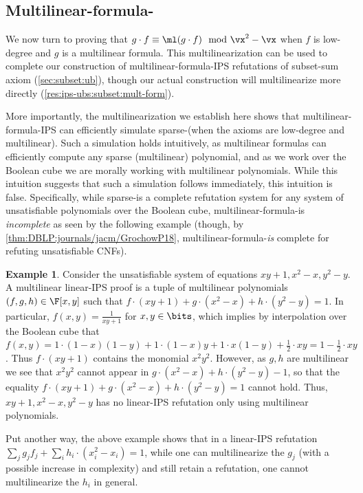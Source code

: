 \documentclass[11pt]{article}
\numberwithin{equation}{section}
\theoremstyle{definition}
\newtheorem{example}[theorem]{Example}
\theoremstyle{plain}
\begin{document}
\subsection{Multilinear-formula-\lbIPS}\label{sec:multilinearization:mult-form}

We now turn to proving that $g\cdot f\equiv \ml(g\cdot f) \mod \vx^2-\vx$ when $f$ is low-degree and $g$ is a multilinear formula.  This multilinearization can be used to complete our construction of multilinear-formula-IPS refutations of subset-sum axiom (\autoref{sec:subset:ub}), though our actual construction will multilinearize more directly (\autoref{res:ips-ubs:subset:mult-form}).

More importantly, the multilinearization we establish here shows that multilinear-formula-IPS can efficiently simulate sparse-\lIPS (when the axioms are low-degree and multilinear).  Such a simulation holds intuitively, as multilinear formulas can efficiently compute any sparse (multilinear) polynomial, and as we work over the Boolean cube we are morally working with multilinear polynomials.  While this intuition suggests that such a simulation follows immediately, this intuition is false. Specifically, while sparse-\lIPS is a complete refutation system for any system of unsatisfiable polynomials over the Boolean cube, multilinear-formula-\lIPS is \emph{incomplete} as seen by the following example (though, by \autoref{thm:DBLP:journals/jacm/GrochowP18}, multilinear-formula-\lIPS \emph{is} complete for refuting unsatisfiable CNFs).

\begin{example}\label{ex:multi-form:incomplete}
        Consider the unsatisfiable system of equations $xy+1,x^2-x,y^2-y$.  A multilinear linear-IPS proof is a tuple of multilinear polynomials $(f,g,h)\in\F[x,y]$ such that $f\cdot (xy+1)+g\cdot (x^2-x)+h\cdot (y^2-y)=1$.  In particular, $f(x,y)=\frac{1}{xy+1}$ for $x,y\in\bits$, which implies by interpolation over the Boolean cube that $f(x,y)=1\cdot (1-x)(1-y)+1\cdot (1-x)y+1\cdot x(1-y)+\frac{1}{2} \cdot xy=1-\frac{1}{2}\cdot xy$.  Thus $f\cdot (xy+1)$ contains the monomial $x^2y^2$.  However, as $g,h$ are multilinear we see that $x^2y^2$ cannot appear in $g\cdot (x^2-x)+h\cdot (y^2-y)-1$, so that the equality $f\cdot (xy+1)+g\cdot (x^2-x)+h\cdot (y^2-y)=1$ cannot hold. Thus, $xy+1,x^2-x,y^2-y$ has no linear-IPS refutation only using multilinear polynomials.
\end{example}

Put another way, the above example shows that in a linear-IPS refutation $\sum_j g_j f_j+\sum_i h_i\cdot (x_i^2-x_i)=1$, while one can multilinearize the $g_j$ (with a possible increase in complexity) and still retain a refutation, one cannot multilinearize the $h_i$ in general.
\end{document}
